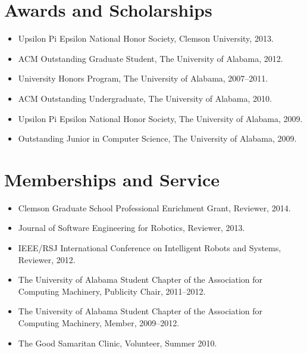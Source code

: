 \documentclass[12pt,oldfontcommands]{memoir}
\begin{document}
\nocite{*}



\section*{Awards and Scholarships}

\begin{itemize}[leftmargin=*]
  \item Upsilon Pi Epsilon National Honor Society, Clemson University, 2013.
  \item ACM Outstanding Graduate Student, The University of Alabama, 2012.
  \item University Honors Program, The University of Alabama, 2007--2011.
  \item ACM Outstanding Undergraduate, The University of Alabama, 2010.
  \item Upsilon Pi Epsilon National Honor Society, The University of Alabama, 2009.
  \item Outstanding Junior in Computer Science, The University of Alabama, 2009.
\end{itemize}

\section*{Memberships and Service}

\begin{itemize}[leftmargin=*]
  \item Clemson Graduate School Professional Enrichment Grant, Reviewer, 2014.
  \item Journal of Software Engineering for Robotics, Reviewer, 2013.
  \item IEEE/RSJ International Conference on Intelligent Robots and
        Systems, Reviewer, 2012.
  \item The University of Alabama Student Chapter of the Association for
        Computing Machinery, Publicity Chair, 2011--2012.
  \item The University of Alabama Student Chapter of the Association for
        Computing Machinery, Member, 2009--2012.
  \item The Good Samaritan Clinic, Volunteer, Summer 2010.
\end{itemize}
\end{document}
